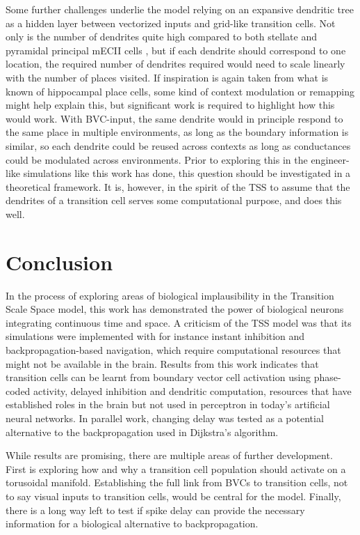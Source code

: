 \documentclass{article}
\begin{document}
    Some further challenges underlie the model relying on an expansive dendritic tree as a hidden layer between vectorized inputs and grid-like transition cells. Not only is the number of dendrites quite high compared to both stellate and pyramidal principal mECII cells \parencite{Klink1997}, but if each dendrite should correspond to one location, the required number of dendrites required would need to scale linearly with the number of places visited. If inspiration is again taken from what is known of hippocampal place cells, some kind of context modulation or remapping might help explain this, but significant work is required to highlight how this would work. With BVC-input, the same dendrite would in principle respond to the same place in multiple environments, as long as the boundary information is similar, so each dendrite could be reused across contexts as long as conductances could be modulated across environments. Prior to exploring this in the engineer-like simulations like this work has done, this question should be investigated in a theoretical framework.
    It is, however, in the spirit of the TSS to assume that the dendrites of a transition cell serves some computational purpose, and does this well.

    \section{Conclusion}
    In the process of exploring areas of biological implausibility in the Transition Scale Space model, this work has demonstrated the power of biological neurons integrating continuous time and space. A criticism of the TSS model was that its simulations were implemented with for instance instant inhibition and backpropagation-based navigation, which require computational resources that might not be available in the brain. Results from this work indicates that transition cells can be learnt from boundary vector cell activation using phase-coded activity, delayed inhibition and dendritic computation, resources that have established roles in the brain but not used in perceptron in today's artificial neural networks. In parallel work, changing delay was tested as a potential alternative to the backpropagation used in Dijkstra's algorithm. 
    
    While results are promising, there are multiple areas of further development. First is exploring how and why a transition cell population should activate on a torusoidal manifold. Establishing the full link from BVCs to transition cells, not to say visual inputs to transition cells, would be central for the model. Finally, there is a long way left to test if spike delay can provide the necessary information for a biological alternative to backpropagation.

    \printbibliography{}
\end{document}
